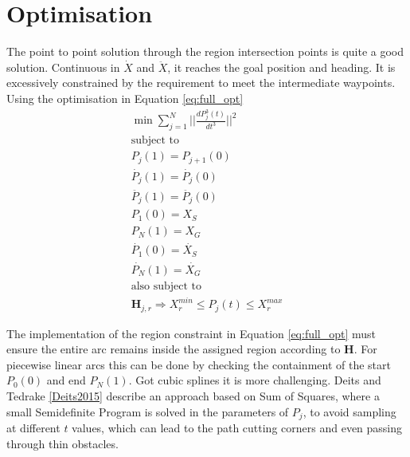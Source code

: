 \section{Optimisation}
The point to point solution through the region intersection points is quite a good solution. Continuous in $\dot{X}$ and $\ddot{X}$, it reaches the goal position and heading. It is excessively constrained by the requirement to meet the intermediate waypoints.
Using the optimisation in Equation \ref{eq:full_opt}  
\begin{equation}
\begin{array}{c}
\min \sum_{j=1}^N ||\frac{dP_j^3(t)}{dt^3}||^2 \\
\textrm{subject to} \\
P_j(1) = P_{j+1}(0) \\
\dot{P_j}(1) = \dot{P_j}(0) \\
\ddot{P_j}(1) = \ddot{P_j}(0) \\
P_1(0) = X_S \\ 
P_N(1) = X_G \\
\dot{P_1}(0) = \dot{X_S} \\
\dot{P_N}(1) = \dot{X_G} \\ 
\textrm{also subject to} \\
\bm{H}_{j,r} \Rightarrow X_r^{min} \leq P_j(t) \leq X_r^{max} 
\end{array}
\label{eq:full_opt}
\end{equation}

The implementation of the region constraint in Equation \ref{eq:full_opt} must ensure the entire arc remains inside the assigned region according to $\bm{H}$. For piecewise linear arcs this can be done by checking the containment of the start $P_0(0)$ and end $P_N(1)$. Got cubic splines it is more challenging. Deits and Tedrake \ref{Deits2015} describe an approach based on Sum of Squares, where a small Semidefinite Program is solved in the parameters of $P_j$, to avoid sampling at different $t$ values, which can lead to the path cutting corners and even passing through thin obstacles.


